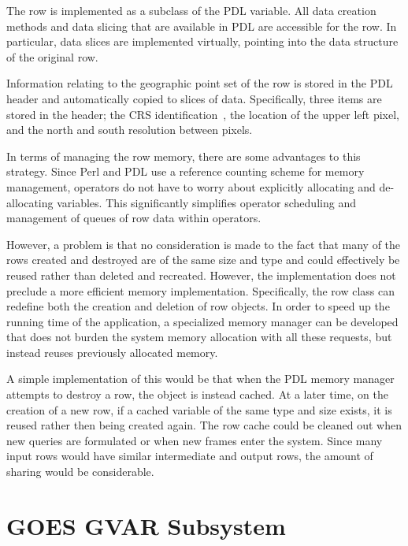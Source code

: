 \documentclass{ucdthesis}       %
\begin{document}

The row is implemented as a subclass of the \ac{PDL}
variable.  All data creation methods and data slicing that are
available in \ac{PDL} are accessible for the row.  In
particular, data slices are implemented virtually, pointing into the
data structure of the original row.

Information relating to the geographic point set of the row is
stored in the \ac{PDL} header and automatically copied to slices of
data.  Specifically, three items are stored in the header; the
\ac{CRS} identification~\cite{02coord-conver}, the location
of the upper left pixel, and the north and south resolution between
pixels.

In terms of managing the row memory, there are some advantages to this
strategy.  Since Perl and \ac{PDL} use a reference counting
scheme for memory management, operators do not have to worry about
explicitly allocating and de-allocating variables.  This significantly
simplifies operator scheduling and management of queues of row
data within operators.

However, a problem is that no consideration is made to the fact that
many of the rows created and destroyed are of the same size and type
and could effectively be reused rather than deleted and recreated.
However, the implementation does not preclude a more efficient memory
implementation.  Specifically, the row class can redefine both the
creation and deletion of row objects.  In order to speed up the
running time of the application, a specialized memory manager can be
developed that does not burden the system memory allocation with all
these requests, but instead reuses previously allocated memory.

A simple implementation of this would be that when the \ac{PDL} memory
manager attempts to destroy a row, the object is instead cached.
At a later time, on the creation of a new row, if a cached
variable of the same type and size exists, it is reused rather then
being created again.  The row cache could be cleaned out when new
queries are formulated or when new frames enter the system.  Since
many input rows would have similar intermediate and output rows, the
amount of sharing would be considerable.


\section{\ac{GOES} \ac{GVAR} Subsystem}
\label{sec:goes-op}
\end{document}
